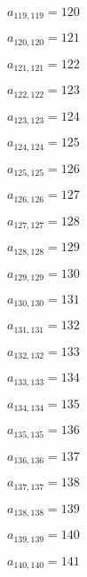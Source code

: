 \documentclass[a4paper,12pt]{article}
\begin{document}
$a _{ 119, 119 } = 120$

$a _{ 120, 120 } = 121$

$a _{ 121, 121 } = 122$

$a _{ 122, 122 } = 123$

$a _{ 123, 123 } = 124$

$a _{ 124, 124 } = 125$

$a _{ 125, 125 } = 126$

$a _{ 126, 126 } = 127$

$a _{ 127, 127 } = 128$

$a _{ 128, 128 } = 129$

$a _{ 129, 129 } = 130$

$a _{ 130, 130 } = 131$

$a _{ 131, 131 } = 132$

$a _{ 132, 132 } = 133$

$a _{ 133, 133 } = 134$

$a _{ 134, 134 } = 135$

$a _{ 135, 135 } = 136$

$a _{ 136, 136 } = 137$

$a _{ 137, 137 } = 138$

$a _{ 138, 138 } = 139$

$a _{ 139, 139 } = 140$

$a _{ 140, 140 } = 141$
\end{document}
